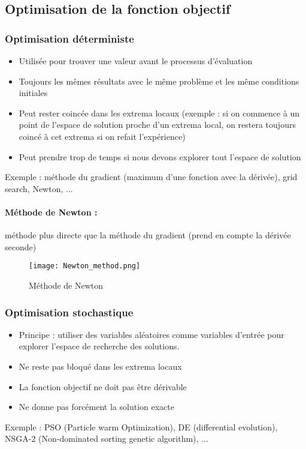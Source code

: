 \subsection{Optimisation de la fonction objectif}
\subsubsection{Optimisation déterministe}
\begin{itemize}
    \item Utilisée pour trouver une valeur avant le processus d’évaluation 
    \item Toujours les mêmes résultats avec le même problème et les même conditions initiales
    \item Peut rester coincée dans les extrema locaux (exemple : si on commence à un point de l’espace de solution proche d’un extrema local, on restera toujours coincé à cet extrema si on refait l’expérience)
    \item Peut prendre trop de temps si nous devons explorer tout l’espace de solution
\end{itemize}

Exemple : méthode du gradient (maximum d’une fonction avec la dérivée), grid search, Newton, ...

\paragraph{Méthode de Newton :} méthode plus directe que la méthode du gradient (prend en compte la dérivée seconde)

\begin{figure}[h!]
    \centering
    \texttt{[image: Newton\_method.png]}
    \caption{Méthode de Newton}
\end{figure}

\subsubsection{Optimisation stochastique}
\begin{itemize}
    \item Principe : utiliser des variables aléatoires comme variables d’entrée pour explorer l’espace de recherche des solutions.
    \item Ne reste pas bloqué dans les extrema locaux
    \item La fonction objectif ne doit pas être dérivable
    \item Ne donne pas forcément la solution exacte
\end{itemize}
Exemple : PSO (Particle warm Optimization), DE (differential evolution), NSGA-2 (Non-dominated sorting genetic algorithm), ...

